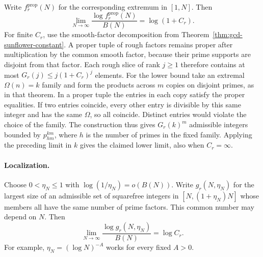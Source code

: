 \documentclass[11pt,a4paper]{article}
\begin{document}
Write $f_r^{\mathrm{prop}}(N)$ for the corresponding extremum in $[1,N]$. Then
\[
 \lim_{N\to\infty}\frac{\log f_r^{\mathrm{prop}}(N)}{B(N)}=\log(1+C_r).
\]
For finite $C_r$, use the smooth-factor decomposition from
Theorem~\ref{thm:gcd-sunflower-constant}. A proper tuple of rough factors
remains proper after multiplication by the common smooth factor, because
their prime supports are disjoint from that factor. Each rough slice of
rank $j\ge1$ therefore contains at most $G_r(j)\le j(1+C_r)^j$ elements.
For the lower bound take an extremal $\Omega(n)=k$ family and form the
products across $m$ copies on disjoint primes, as in that theorem. In a
proper tuple the entries in each copy satisfy the proper equalities.
If two entries coincide, every other entry is divisible by this same
integer and has the same $\Omega$, so all coincide. Distinct entries
would violate the choice of the family. The construction thus gives
$G_r(k)^m$ admissible integers bounded by $p_{hm}^{km}$, where $h$ is
the number of primes in the fixed family. Applying the preceding limit
in $k$ gives the claimed lower limit, also when $C_r=\infty$.

\paragraph{Localization.}
Choose $0<\eta_N\le1$ with $\log(1/\eta_N)=o(B(N))$. Write
$g_r(N,\eta_N)$ for the largest size of an admissible set of squarefree
integers in $[N,(1+\eta_N)N]$ whose members all have the same number of
prime factors. This common number may depend on $N$. Then
\[
 \lim_{N\to\infty}\frac{\log g_r(N,\eta_N)}{B(N)}=\log C_r.
\]
For example, $\eta_N=(\log N)^{-A}$ works for every fixed $A>0$.
\end{document}
